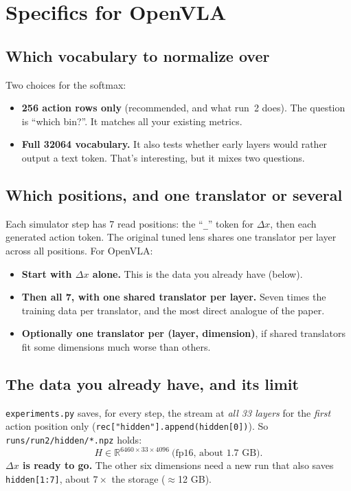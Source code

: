 \documentclass[11pt]{article}
\begin{document}
\section{Specifics for OpenVLA}

\subsection{Which vocabulary to normalize over}
Two choices for the softmax:
\begin{itemize}
  \item \textbf{256 action rows only} (recommended, and what run~2 does). The question is ``which bin?''. It matches all your existing metrics.
  \item \textbf{Full 32064 vocabulary.} It also tests whether early layers would rather output a text token. That's interesting, but it mixes two questions.
\end{itemize}

\subsection{Which positions, and one translator or several}
Each simulator step has 7 read positions: the ``\texttt{\_}'' token for $\Delta x$, then each generated action token. The original tuned lens shares one translator per layer across all positions. For OpenVLA:
\begin{itemize}
  \item \textbf{Start with $\Delta x$ alone.} This is the data you already have (below).
  \item \textbf{Then all 7, with one shared translator per layer.} Seven times the training data per translator, and the most direct analogue of the paper.
  \item \textbf{Optionally one translator per (layer, dimension)}, if shared translators fit some dimensions much worse than others.
\end{itemize}

\subsection{The data you already have, and its limit}
\texttt{experiments.py} saves, for every step, the stream at \emph{all 33 layers} for the \emph{first} action position only (\texttt{rec["hidden"].append(hidden[0])}). So \texttt{runs/run2/hidden/*.npz} holds:
\[
H \in \mathbb{R}^{6460 \times 33 \times 4096}\ \text{(fp16, about 1.7 GB)}.
\]
\textbf{$\Delta x$ is ready to go.} The other six dimensions need a new run that also saves \texttt{hidden[1:7]}, about $7\times$ the storage ($\approx$12 GB).
\end{document}
